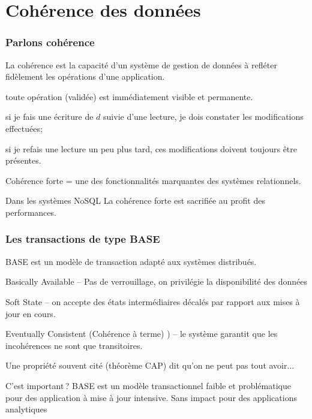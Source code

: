 \section{Cohérence des données}


\begin{frame}
\frametitle{Parlons cohérence}

La cohérence est la capacité d’un système de gestion de données à refléter fidèlement les opérations d’une application.
 
\begin{redbullet}
  \item toute opération (validée) est immédiatement visible et permanente. 
  \item si je fais une écriture de $d$ suivie d’une lecture, je dois constater les modifications effectuées; 
  \item si je refais une lecture un peu plus tard, ces modifications doivent toujours être présentes.
\end{redbullet}

\alert{Cohérence forte = } une des fonctionnalités marquantes des systèmes relationnels.

\begin{remblock}{Dans les systèmes NoSQL}
\alert{La cohérence forte est sacrifiée au profit des performances.} 
\end{remblock}
\end{frame}


\begin{frame}
\frametitle{Les transactions de type BASE}

BASE est un modèle de transaction adapté aux systèmes distribués.

\vfill

\begin{redbullet}
  \item \alert{Basically Available} -- Pas de verrouillage, on privilégie
       la disponibilité des données
       
  \item \alert{Soft State} -- on accepte des états intermédiaires décalés par rapport 
      aux mises à jour en cours.
  
  \item \alert{Eventually Consistent} (Cohérence à terme) ) -- le système
     garantit que les incohérences ne sont que transitoires. 
\end{redbullet}
\vfill

Une propriété souvent cité (théorème CAP) dit qu'on ne peut pas tout avoir...
\vfill

\begin{noteblock}{C'est important\,?}
BASE est un modèle transactionnel faible et problématique pour des 
application à mise à jour intensive. Sans impact pour des applications
analytiques
\end{noteblock}

\end{frame}



